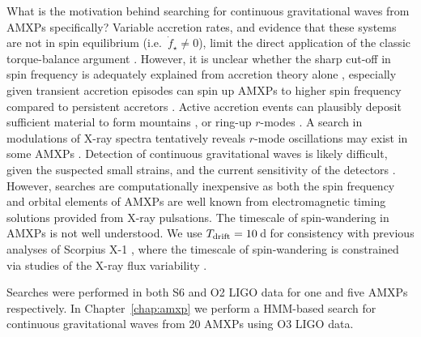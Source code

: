 What is the motivation behind searching for continuous gravitational waves from AMXPs specifically? Variable accretion rates, and evidence that these systems are not in spin equilibrium (i.e.~$\dot{f}_\star \neq 0$), limit the direct application of the classic torque-balance argument \citep{Bildsten1998}. However, it is unclear whether the sharp cut-off in spin frequency is adequately explained from accretion theory alone \citep{Chakrabarty2003,Patruno2012a}, especially given transient accretion episodes can spin up AMXPs to higher spin frequency compared to persistent accretors \citep{Bhattacharyya2017}. Active accretion events can plausibly deposit sufficient material to form mountains \citep{Bildsten1998,Cutler2002,Melatos2005,Haskell2017a}, or ring-up $r$-modes \citep{Andersson1999a,Bondarescu2013,Alford2015}. A search in modulations of X-ray spectra tentatively reveals $r$-mode oscillations may exist in some AMXPs \citep{Mahmoodifar2013,Strohmayer2014}. Detection of continuous gravitational waves is likely difficult, given the suspected small strains, and the current sensitivity of the detectors \citep{Watts2008,Haskell2015GW}. However, searches are computationally inexpensive as both the spin frequency and orbital elements of AMXPs are well known from electromagnetic timing solutions provided from X-ray pulsations. The timescale of spin-wandering in AMXPs is not well understood. We use $T_{\textrm{drift}}=10\,$d for consistency with previous analyses of Scorpius X-1 \citep{Sammut2014, o1vitsco, o2vitsco, o3vitsco}, where the timescale of spin-wandering is constrained via studies of the X-ray flux variability \citep{Mukherjee2018}.

Searches were performed in both S6 \citep{s6twoSpectScoXTE} and O2 LIGO data \citep{Middleton2020} for one and five AMXPs respectively. In Chapter~\ref{chap:amxp} we perform a HMM-based search for continuous gravitational waves from 20 AMXPs using O3 LIGO data. 

\newpage
